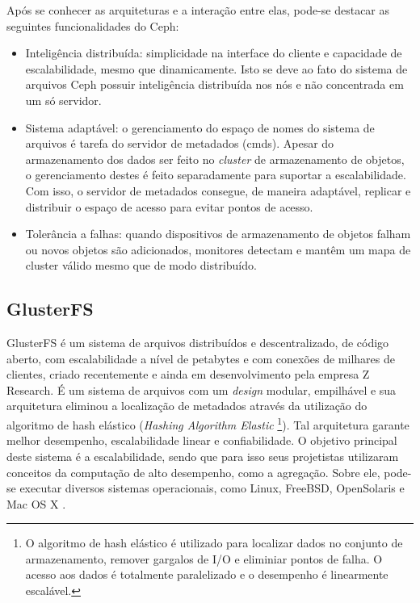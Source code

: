 Após se conhecer as arquiteturas e a interação entre elas, pode-se destacar as seguintes funcionalidades do Ceph:
\begin{itemize}
 \item Inteligência distribuída:  simplicidade na interface do cliente e capacidade de escalabilidade, mesmo que dinamicamente. Isto se deve ao fato do sistema de arquivos Ceph possuir inteligência distribuída nos nós e não concentrada em um só servidor.
 \item Sistema adaptável: o gerenciamento do espaço de nomes do sistema de arquivos é tarefa do servidor de metadados (cmds). Apesar do armazenamento dos dados ser feito no \textit{cluster} de armazenamento de objetos, o gerenciamento destes é feito separadamente para suportar a escalabilidade. Com isso, o servidor de metadados consegue, de maneira adaptável, replicar e distribuir o espaço de acesso para evitar pontos de acesso.
 \item Tolerância a falhas: quando dispositivos de armazenamento de objetos falham ou novos objetos são adicionados, monitores detectam e mantêm um mapa de cluster válido mesmo que de modo distribuído. 
 \end{itemize}


 
\subsection{GlusterFS}
\label{sec:gluster}

GlusterFS é um sistema de arquivos distribuídos e descentralizado, de código aberto, com escalabilidade a nível de petabytes e com conexões de milhares de clientes, criado recentemente e ainda em desenvolvimento pela empresa Z Research. É um sistema de arquivos com um \textit{design} modular, empilhável e sua arquitetura eliminou a localização de metadados através da utilização do algoritmo de hash elástico (\textit{Hashing Algorithm Elastic} \footnote{O algoritmo de hash elástico é utilizado para localizar dados no conjunto de armazenamento, remover gargalos de I/O e eliminiar pontos de falha. O acesso aos dados é totalmente paralelizado e o desempenho é linearmente escalável.}). Tal arquitetura garante melhor desempenho, escalabilidade linear e confiabilidade. O objetivo principal deste sistema é a escalabilidade, sendo que para isso seus projetistas utilizaram conceitos da computação de alto desempenho, como a agregação. Sobre ele, pode-se executar diversos sistemas operacionais, como Linux, FreeBSD, OpenSolaris e Mac OS X \cite{Mohanty2014} .

